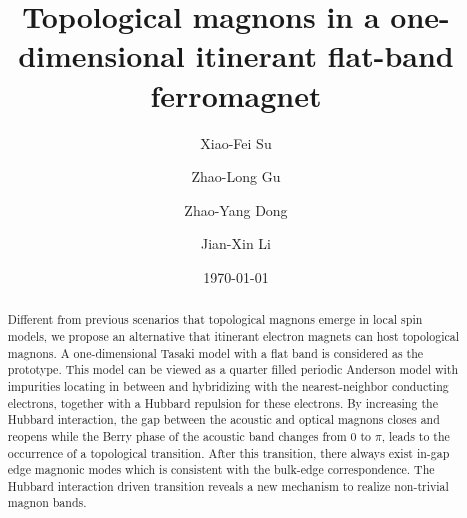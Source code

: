 \documentclass[amsmath,superscriptaddress,showpacs,aps,prb,twocolumn]{revtex4-1}
\begin{document}
\title{Topological magnons in a one-dimensional itinerant flat-band ferromagnet}
\author{Xiao-Fei Su}
\author{Zhao-Long Gu}
\author{Zhao-Yang Dong}
\author{Jian-Xin Li}
\date{\today}

\begin{abstract}

\par Different from previous scenarios that topological magnons emerge in local spin models, we propose an alternative that itinerant electron magnets can host topological magnons. A one-dimensional Tasaki model with a flat band is considered as the prototype. This model can be viewed as a quarter filled periodic Anderson model with impurities locating in between and hybridizing with the nearest-neighbor conducting electrons, together with a Hubbard repulsion for these electrons. By increasing the Hubbard interaction, the gap between the acoustic and optical magnons closes and reopens while the Berry phase of the acoustic band changes from 0 to $\pi$, leads to the occurrence of a topological transition. After this transition, there always exist in-gap edge magnonic modes which is consistent with the bulk-edge correspondence. The Hubbard interaction driven transition reveals a new mechanism to realize non-trivial magnon bands.

\end{abstract}

\maketitle
\end{document}
